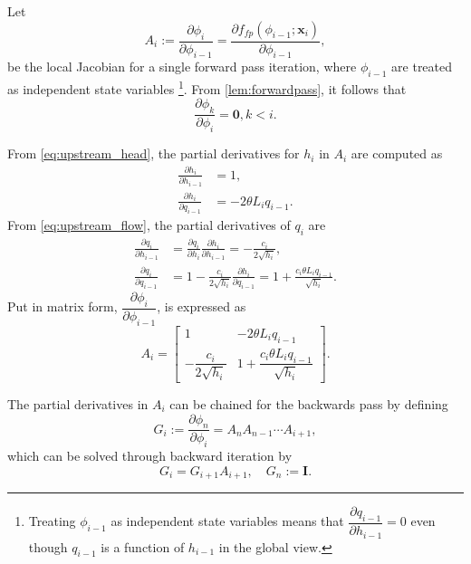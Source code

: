 Let
\begin{equation*}
    A_i:=\frac{\partial \phi_i}{\partial \phi_{i-1}} = \frac{\partial f_{fp}(\phi_{i-1}; \mathbf{x}_i )}{\partial \phi_{i-1}},
\end{equation*}
be the local Jacobian for a single forward pass iteration, where $\phi_{i-1}$ are treated as independent state variables 
\footnote{Treating $\phi_{i-1}$ as independent state variables means that $\dfrac{\partial q_{i-1}}{\partial h_{i-1}}=0$ even though $q_{i-1}$ is a function of $h_{i-1}$ in the global view.}. From \autoref{lem:forwardpass}, it follows that
\begin{equation*}
    \frac{\partial \phi_k}{\partial \phi_i}=\mathbf{0}, k<i.
\end{equation*}

From \cref{eq:upstream_head}, the partial derivatives for $h_i$ in $A_i$ are computed as
\begin{align*}
    \frac{\partial h_i}{\partial h_{i-1}} &= 1, \\
    \frac{\partial h_i}{\partial q_{i-1}} &= -2 \theta L_i q_{i-1}.
\end{align*}
From \cref{eq:upstream_flow}, the partial derivatives of $q_i$ are
\begin{align*}
    \frac{\partial q_i}{\partial h_{i-1}} &= \frac{\partial q_i}{\partial h_{i}}\frac{\partial h_i}{\partial h_{i-1}} = -\frac{c_i}{2 \sqrt{h_{i}}}, \\
    \frac{\partial q_i}{\partial q_{i-1}} &= 1 - \frac{c_i}{2 \sqrt{h_i}}\frac{\partial h_i}{\partial q_{i-1}}
    = 1+\frac{c_i \theta L_i q_{i-1}}{\sqrt{h_i}}.
\end{align*}
Put in matrix form, $\dfrac{\partial \phi_i}{\partial \phi_{i-1}}$, is expressed as 
\begin{equation}
\label{eq:A_i}
A_i=\begin{bmatrix}
    1 & -2 \theta L_i q_{i-1} \\[0.4em]
    -\dfrac{c_i}{2 \sqrt{h_{i}}} & 1+\dfrac{c_i \theta L_i q_{i-1}}{\sqrt{h_i}}
\end{bmatrix}.
\end{equation}

The partial derivatives in $A_i$ can be chained for the backwards pass by defining
\begin{equation*}
    G_i := \frac{\partial \phi_n}{\partial \phi_i} = A_n A_{n-1} \cdots A_{i+1},
\end{equation*}
which can be solved through backward iteration by
\begin{equation*}
    G_i = G_{i+1}A_{i+1}, \quad G_n:=\mathbf{I}.
\end{equation*}

